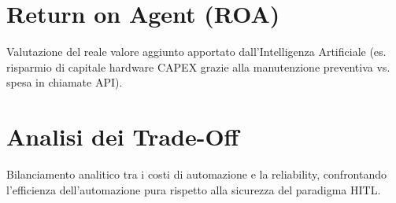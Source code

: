 \section{Return on Agent (ROA)}
\label{sec:roa}
Valutazione del reale valore aggiunto apportato dall'Intelligenza Artificiale (es. risparmio di capitale hardware CAPEX grazie alla manutenzione preventiva vs. spesa in chiamate API).

\section{Analisi dei Trade-Off}
\label{sec:analisi_tradeoff}
Bilanciamento analitico tra i costi di automazione e la reliability, confrontando l'efficienza dell'automazione pura rispetto alla sicurezza del paradigma HITL.